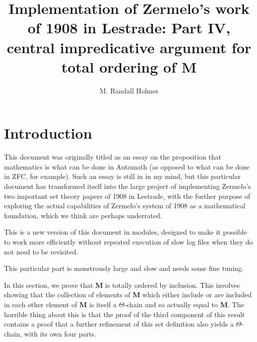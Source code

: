 \documentclass[12pt]{article}
\title{Implementation of Zermelo's work of 1908 in Lestrade:  Part IV, central impredicative argument for total ordering of {\bf M}}
\author{M. Randall Holmes}
\begin{document}
\maketitle

\section{Introduction}
 
This document was originally titled as an essay on the proposition that mathematics is what can be done in Automath (as opposed to what can be done in ZFC, for example).  Such an essay is still in in my mind, but this particular document has transformed itself into the large project of implementing Zermelo's two important set theory papers of 1908 in Lestrade, with the further purpose of exploring the actual capabilities of Zermelo's system of 1908 as a mathematical foundation, which we think are perhaps underrated.

This is a new version of this document in modules, designed to make it possible to work more efficiently without repeated execution of slow log files when they do not need to be revisited.

This particular part is monstrously large and slow and needs some fine tuning.

In this section, we prove that {\bf M} is totally ordered by inclusion.  This involves showing that the collection of elements of {\bf M} which either include or are included in each other element of {\bf M} is itself a $\Theta$-chain and so actually equal to {\bf M}.  The horrible thing about this is that the proof of the third component of this result contains a proof that a further refinement of this set definition also yields a $\Theta$-chain, with its own four parts.
\end{document}
